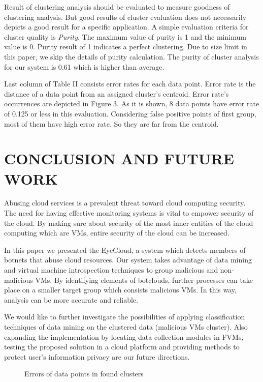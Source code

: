\documentclass[conference]{IEEEtran}
\begin{document}
Result of clustering analysis should be evaluated to measure goodness of clustering analysis. But good results of cluster evaluation does not necessarily depicts a good result for a specific application. A simple evaluation criteria for cluster quality is \textit{Purity}. The maximum value of purity is 1 and the minimum value is 0. Purity result of 1 indicates a perfect clustering. Due to size limit in this paper, we skip the details of purity calculation. The purity of cluster analysis for our system is 0.61 which is higher than average. 

Last column of Table II consists error rates for each data point. Error rate is the distance of a data point from an assigned cluster's centroid. Error rate's occurrences are depicted in Figure 3. As it is shown, 8 data points have error rate of 0.125 or less in this evaluation. Considering false positive points of first group, most of them have high error rate. So they are far from the centroid.    


\section{CONCLUSION AND FUTURE WORK}
Abusing cloud services is a prevalent threat toward cloud computing security. The need for having effective monitoring systems is vital to empower security of the cloud. By making sure about security of the most inner entities of the cloud computing which are VMs, entire security of the cloud can be increased. 

In this paper we presented the EyeCloud, a system which detects members of botnets that abuse cloud resources. Our system takes advantage of data mining and virtual machine introspection techniques to group malicious and non-malicious VMs. By identifying elements of botclouds, further processes can take place on a smaller target group which consists malicious VMs. In this way, analysis can be more accurate and reliable. 

We would like to further investigate the possibilities of applying classification techniques of data mining on the clustered data (malicious VMs cluster). Also expanding the implementation by locating data collection modules in FVMs, testing the proposed solution in a cloud platform and providing methods to protect user's information privacy are our future directions. 
\begin{figure}
\small
{}
\begin{center}
\caption{Errors of data points in found clusters}
\end{center}
\end{figure}
\balance



\end{document}

